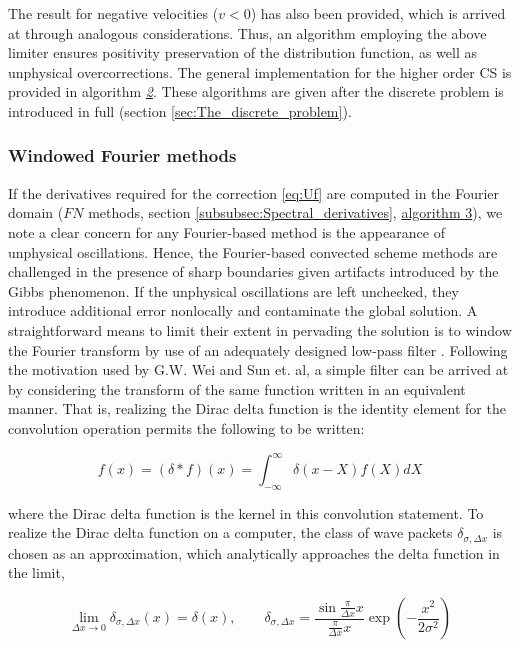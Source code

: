 \documentclass[11pt,titlepage]{report}
\begin{document}
\noindent The result for negative velocities ($v < 0$) has also been provided, which is arrived at through analogous considerations. Thus, an algorithm employing the above limiter ensures positivity preservation of the distribution function, as well as unphysical overcorrections. The general implementation for the higher order CS is provided in algorithm \emph{\hyperlink{alg:2}{2}}. These algorithms are given after the discrete problem is introduced in full (section \ref{sec:The_discrete_problem}).


\subsubsection{Windowed Fourier methods}\label{subsubsec:Windowed_Fourier_methods}

\indent\indent If the derivatives required for the correction \eqref{eq:Uf} are computed in the Fourier domain ($FN$ methods, section \ref{subsubsec:Spectral_derivatives}, \hyperlink{alg:3}{algorithm 3}), we note a clear concern for any Fourier-based method is the appearance of unphysical oscillations. Hence, the Fourier-based convected scheme methods are challenged in the presence of sharp boundaries given artifacts introduced by the Gibbs phenomenon. If the unphysical oscillations are left unchecked, they introduce additional error nonlocally and contaminate the global solution. A straightforward means to limit their extent in pervading the solution is to window the Fourier transform by use of an adequately designed low-pass filter \cite{Wei99, Sun05, Guclu14}. Following the motivation used by G.W. Wei and Sun et. al, a simple filter can be arrived at by considering the transform of the same function written in an equivalent manner. That is, realizing the Dirac delta function is the identity element for the convolution operation permits the following to be written:

\begin{equation}f(x) = (\delta * f)(x) = \int_{-\infty}^{\infty} \delta(x - X)f(X) dX\label{eq:delta_identity_convolution}\end{equation}

\noindent where the Dirac delta function is the kernel in this convolution statement. To realize the Dirac delta function on a computer, the class of wave packets $\delta_{\sigma,\Delta x}$ is chosen as an approximation, which analytically approaches the delta function in the limit,

\begin{equation}\lim_{\Delta x \rightarrow 0}\delta_{\sigma,\Delta x}(x) = \delta(x), \qquad \delta_{\sigma,\Delta x} = \frac{\sin\tfrac{\pi}{\Delta x}x}{\tfrac{\pi}{\Delta x}x}\exp\left(-\frac{x^2}{2\sigma^2}\right)\label{eq:delta_approx}\end{equation}
\end{document}
